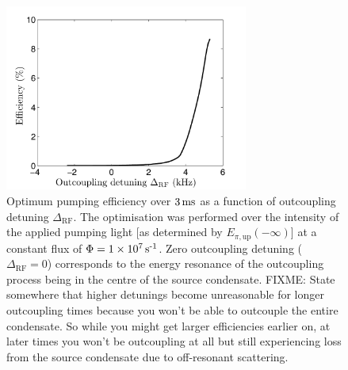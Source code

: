 \begin{figure}
    \centering
    \includegraphics[width=8cm]{3LevelModelEfficiency}
    \caption{Optimum pumping efficiency over $\unit[3]{ms}$ as a function of outcoupling detuning $\Delta_\text{RF}$.  The optimisation was performed over the intensity of the applied pumping light [as determined by $E_{\pi, \text{up}}(-\infty)$] at a constant flux of $\Phi = 1 \times \unit[10^7]{s\textsuperscript{-1}}$.  Zero outcoupling detuning ($\Delta_\text{RF} = 0$) corresponds to the energy resonance of the outcoupling process being in the centre of the source condensate.  FIXME: State somewhere that higher detunings become unreasonable for longer outcoupling times because you won't be able to outcouple the entire condensate.  So while you might get larger efficiencies earlier on, at later times you won't be outcoupling at all but still experiencing loss from the source condensate due to off-resonant scattering.}
    \label{OpticalPumping:3LevelModelEfficiency}
\end{figure}

